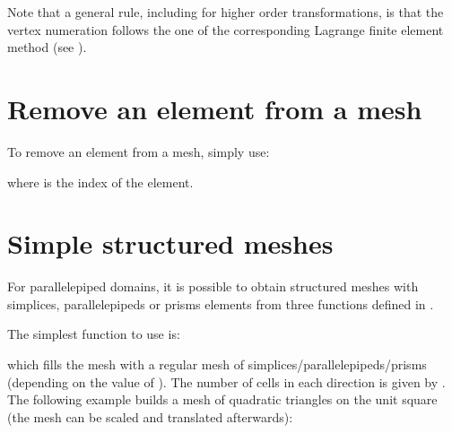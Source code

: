 \documentclass[a4paper,11pt,english]{sphinxmanual}
\begin{document}
Note that a general rule, including for higher order transformations, is that the vertex numeration follows the one of the corresponding Lagrange finite element method (see  {\hyperref[\detokenize{userdoc/appendixA:ud-appendixa}]{}}).


\section{Remove an element from a mesh}
\label{\detokenize{userdoc/bmesh:remove-an-element-from-a-mesh}}
To remove an element from a mesh, simply use:

\begin{sphinxVerbatim}[commandchars=\\\{\}]
\end{sphinxVerbatim}

where  is the index of the element.


\section{Simple structured meshes}
\label{\detokenize{userdoc/bmesh:simple-structured-meshes}}
For parallelepiped domains, it is possible to obtain structured meshes with
simplices, parallelepipeds or prisms elements from three functions defined in
.

The simplest function to use is:

\begin{sphinxVerbatim}[commandchars=\\\{\}]
    
                            
\end{sphinxVerbatim}

which fills the mesh  with a regular mesh of simplices/parallelepipeds/prisms
(depending on the value of ). The number of cells in each direction is given
by . The following example builds a mesh of quadratic triangles on the
unit square (the mesh can be scaled and translated afterwards):
\end{document}
